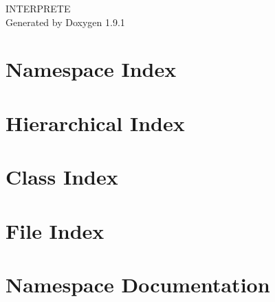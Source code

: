 \let\mypdfximage\pdfximage\def\pdfximage{\immediate\mypdfximage}\documentclass[twoside]{book}
\newcommand{\+}{\discretionary{\mbox{\scriptsize$\hookleftarrow$}}{}{}}
\newcommand{\clearemptydoublepage}{%
  \newpage{\pagestyle{empty}\cleardoublepage}%
}
\begin{document}
\raggedbottom

\hypersetup{pageanchor=false,
             bookmarksnumbered=true,
             pdfencoding=unicode
            }
\begin{titlepage}
\vspace*{7cm}
\begin{center}%
{\Large INTERPRETE }\\
\vspace*{1cm}
{\large Generated by Doxygen 1.9.1}\\
\end{center}
\end{titlepage}
\clearemptydoublepage
{}
\tableofcontents
\clearemptydoublepage
{}
\hypersetup{pageanchor=true}

\chapter{Namespace Index}

\chapter{Hierarchical Index}

\chapter{Class Index}

\chapter{File Index}

\chapter{Namespace Documentation}

\end{document}
